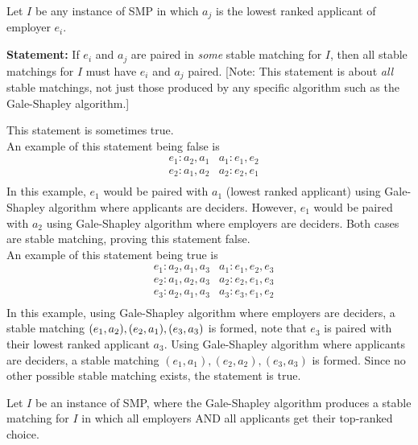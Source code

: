 \documentclass[11pt,fleqn]{exam}
\newif\ifsolutions\solutionsfalse
\newenvironment{soln}{\color{solnblue}}{}
\begin{document}
\begin{questions}
  \question[2]
  Let $I$ be any instance of SMP in which $a_j$ is the lowest ranked applicant of employer $e_i$.

  \noindent
  {\bf Statement:} If $e_i$ and $a_j$ are paired in {\em some} stable matching for $I$, then all stable matchings for $I$ must have $e_i$ and $a_j$ paired. [Note: This statement is about {\em all} stable matchings, not just those produced by any specific algorithm such as the Gale-Shapley algorithm.]

  \begin{soln}
    This statement is sometimes true. \\
    An example of this statement being false is
    \begin{align*}
        & e_1: a_2, a_1 & a_1: e_1, e_2 \\
        & e_2: a_1, a_2 & a_2: e_2, e_1 \\
    \end{align*}
    In this example, $e_1$ would be paired with $a_1$ (lowest ranked applicant) using Gale-Shapley algorithm where applicants are deciders. However, $e_1$ would be paired with $a_2$ using Gale-Shapley algorithm where employers are deciders. Both cases are stable matching, proving this statement false.
    \\
    An example of this statement being true is
    \begin{align*}
        & e_1: a_2, a_1, a_3 & a_1: e_1, e_2, e_3 \\
        & e_2: a_1, a_2, a_3 & a_2: e_2, e_1, e_3 \\
        & e_3: a_2, a_1, a_3 & a_3: e_3, e_1, e_2 \\
    \end{align*}
    In this example, using Gale-Shapley algorithm where employers are deciders, a stable matching $(e_1, a_2), \\ (e_2, a_1), (e_3, a_3)$ is formed, note that $e_3$ is paired with their lowest ranked applicant $a_3$. Using Gale-Shapley algorithm where applicants are deciders, a stable matching $(e_1, a_1), (e_2, a_2), (e_3, a_3)$ is formed. Since no other possible stable matching exists, the statement is true.
  \end{soln}
  \ifsolutions
    
  \else
  \fi

  \question[2]
  Let $I$ be an instance of SMP, where the Gale-Shapley algorithm produces a stable matching for $I$ in which all employers AND all applicants get their top-ranked choice.


\end{questions}
\end{document}
